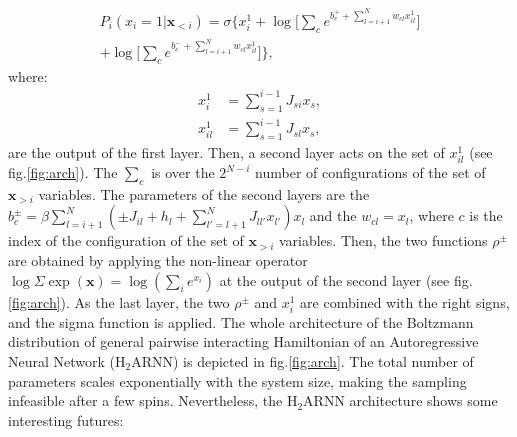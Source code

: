 \documentclass[aps,physrev,10pt,floatfix,reprint]{revtex4-2}
\begin{document}
\begin{multline}
    \label{eq:H2ANN}
        P_i\left(x_i=1 | \mathbf{x}_{<i}\right) = 
     \sigma \bigg\{ x_i^1 + \log\big[ \sum_{c} e^{b_c^+ + \sum_{l=i+1}^{N} w_{cl} x_{il}^1}\big]\\
     +\log\big[ \sum_{c} e^{b_c^- + \sum_{l=i+1}^{N} w_{cl} x_{il}^1}\big] \bigg\},
\end{multline}
where:
\begin{align}
    \label{eq:x_i_first}
    x_i^1 &= \sum_{s=1}^{i-1} J_{si} x_s,\\
    \label{eq:x_il_first}
    x_{il}^1 &= \sum_{s=1}^{i-1} J_{sl} x_s,
\end{align}
 are the output of the first layer. 
Then, a second layer acts on the set of $x_{il}^1$ (see fig.\ref{fig:arch}). The $\sum_{c}$ is over the $2^{N-i}$ number of configurations of the set of $\mathbf{x}_{>i}$ variables. 
The parameters of the second layers are the $b_c^{\pm} = \beta\sum_{l=i+1}^N (\pm J_{il} + h_l + \sum_{l'=l+1}^N J_{ll'}x_{l'}) x_l $ and the $w_{cl}=x_l$, where $c$ is the index of the configuration of the set of $\mathbf{x}_{>i}$ variables. Then, the two functions $\rho^{\pm}$ are obtained by applying the non-linear operator $\log \Sigma \exp (\mathbf{x}) = \log(\sum_i e^{x_i})$ at the output of the second layer (see fig.\ref{fig:arch}). 
As the last layer, the two $\rho^{\pm}$ and $x_i^1$ are combined with the right signs, and the sigma function is applied. The whole architecture of the Boltzmann distribution of general pairwise interacting Hamiltonian of an Autoregressive Neural Network ($\text{H}_2\text{ARNN}$) is depicted in fig.\ref{fig:arch}. The total number of parameters scales exponentially with the system size, making the sampling infeasible after a few spins.
Nevertheless, the $\text{H}_2\text{ARNN}$ architecture shows some interesting futures:
\end{document}
